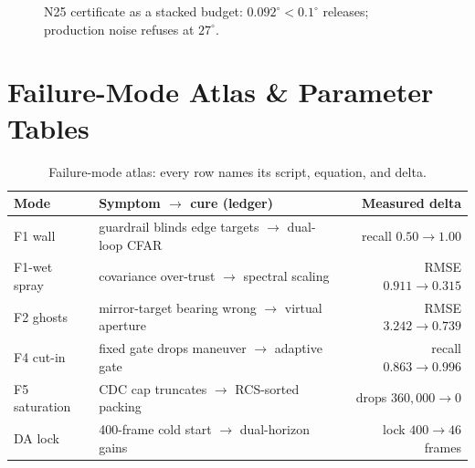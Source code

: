 \documentclass[11pt,oneside]{book}
\begin{document}
\begin{figure}[htbp]
\centering
{}
\caption{N25 certificate as a stacked budget: $0.092^\circ<0.1^\circ$
releases; production noise refuses at $27^\circ$.}
\label{fig:cert-budget}
\end{figure}

\appendix
\chapter{Failure-Mode Atlas \& Parameter Tables}
\label{ch:atlas}

\begin{table}[htbp]
\centering\small
\begin{tabularx}{\linewidth}{@{}lXr@{}}
\toprule
Mode & Symptom $\to$ cure (ledger) & Measured delta \\
\midrule
F1 wall & guardrail blinds edge targets $\to$ dual-loop CFAR & recall $0.50\to1.00$ \\
F1-wet spray & covariance over-trust $\to$ spectral scaling & RMSE $0.911\to0.315$ \\
F2 ghosts & mirror-target bearing wrong $\to$ virtual aperture & RMSE $3.242\to0.739$ \\
F4 cut-in & fixed gate drops maneuver $\to$ adaptive gate & recall $0.863\to0.996$ \\
F5 saturation & CDC cap truncates $\to$ RCS-sorted packing & drops $360{,}000\to0$ \\
DA lock & 400-frame cold start $\to$ dual-horizon gains & lock $400\to46$ frames \\
\bottomrule
\end{tabularx}
\caption{Failure-mode atlas: every row names its script, equation, and delta.}
\label{tab:atlas}
\end{table}
\end{document}
